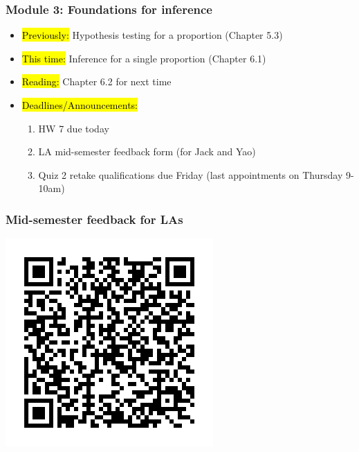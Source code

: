 
\begin{frame}
    \frametitle{Module 3: Foundations for inference}
    \begin{itemize}
        \item \hl{Previously: }Hypothesis testing for a proportion (Chapter 5.3)
        \item \hl{This time: }Inference for a single proportion (Chapter 6.1)
        \item \hl{Reading: }Chapter 6.2 for next time
        \item \hl{Deadlines/Announcements: }
        \begin{enumerate}
            \item HW 7 due today
            \item LA mid-semester feedback form (for Jack and Yao)
            \item Quiz 2 retake qualifications due Friday (last appointments on Thursday 9-10am)
        \end{enumerate}
    \end{itemize}
    
\end{frame}

\begin{frame}
    \frametitle{Mid-semester feedback for LAs}
    \centering
    \includegraphics[width=\linewidth,height=0.85\paperheight,keepaspectratio]{frame.png}
\end{frame}

